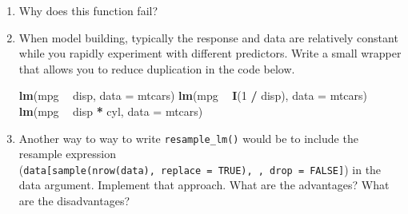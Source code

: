 \documentclass[]{book}
\newenvironment{Shaded}{\begin{snugshade}}{\end{snugshade}}
\newcommand{\CommentTok}[1]{\textcolor[rgb]{0.37,0.37,0.37}{\textit{#1}}}
\newcommand{\ControlFlowTok}[1]{\textcolor[rgb]{0.27,0.27,0.27}{\textbf{#1}}}
\newcommand{\DataTypeTok}[1]{\textcolor[rgb]{0.27,0.27,0.27}{#1}}
\newcommand{\DecValTok}[1]{\textcolor[rgb]{0.06,0.06,0.06}{#1}}
\newcommand{\KeywordTok}[1]{\textcolor[rgb]{0.27,0.27,0.27}{\textbf{#1}}}
\newcommand{\NormalTok}[1]{#1}
\newcommand{\OperatorTok}[1]{\textcolor[rgb]{0.43,0.43,0.43}{\textbf{#1}}}
\newcommand{\StringTok}[1]{\textcolor[rgb]{0.5,0.5,0.5}{#1}}
\begin{document}
\begin{enumerate}
\def\labelenumi{\arabic{enumi}.}
\item
  Why does this function fail?

\begin{Shaded}
\end{Shaded}
\item
  When model building, typically the response and data are relatively
  constant while you rapidly experiment with different predictors. Write a
  small wrapper that allows you to reduce duplication in the code below.

\begin{Shaded}
\begin{Highlighting}[]
\KeywordTok{lm}\NormalTok{(mpg }\OperatorTok{~}\StringTok{ }\NormalTok{disp, }\DataTypeTok{data =}\NormalTok{ mtcars)}
\KeywordTok{lm}\NormalTok{(mpg }\OperatorTok{~}\StringTok{ }\KeywordTok{I}\NormalTok{(}\DecValTok{1} \OperatorTok{/}\StringTok{ }\NormalTok{disp), }\DataTypeTok{data =}\NormalTok{ mtcars)}
\KeywordTok{lm}\NormalTok{(mpg }\OperatorTok{~}\StringTok{ }\NormalTok{disp }\OperatorTok{*}\StringTok{ }\NormalTok{cyl, }\DataTypeTok{data =}\NormalTok{ mtcars)}
\end{Highlighting}
\end{Shaded}
\item
  Another way to way to write \texttt{resample\_lm()} would be to include the
  resample expression (\texttt{data{[}sample(nrow(data),\ replace\ =\ TRUE),\ ,\ drop\ =\ FALSE{]}})
  in the data argument. Implement that approach. What are the advantages?
  What are the disadvantages?
\end{enumerate}
\end{document}
